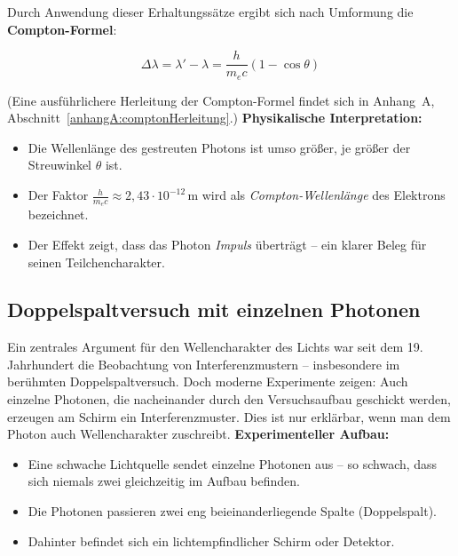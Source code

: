 Durch Anwendung dieser Erhaltungssätze ergibt sich nach Umformung die \textbf{Compton-Formel}:

\vspace{1em}
\begin{tcolorbox}[mathebox, title=Compton-Formel]
	\label{box:comptonFormel}
	\small
	\[
	\Delta \lambda = \lambda' - \lambda = \frac{h}{m_e c}(1 - \cos \theta)
	\]
\end{tcolorbox}
\vspace{1em}
(Eine ausführlichere Herleitung der Compton-Formel findet sich in Anhang~A, Abschnitt~\ref{anhangA:comptonHerleitung}.) %
\textbf{Physikalische Interpretation:}
\begin{itemize}
	\item Die Wellenlänge des gestreuten Photons ist umso größer, je größer der Streuwinkel \( \theta \) ist.
	\item Der Faktor \( \frac{h}{m_e c} \approx 2{,}43 \cdot 10^{-12}\,\mathrm{m} \) wird als \emph{Compton-Wellenlänge} des Elektrons bezeichnet.
	\item Der Effekt zeigt, dass das Photon \emph{Impuls} überträgt – ein klarer Beleg für seinen Teilchencharakter.
\end{itemize}

\vspace{1em}

\subsection{Doppelspaltversuch mit einzelnen Photonen}

Ein zentrales Argument für den Wellencharakter des Lichts war seit dem 19. Jahrhundert die Beobachtung von Interferenzmustern – insbesondere im berühmten Doppelspaltversuch. Doch moderne Experimente zeigen: Auch einzelne Photonen, die nacheinander durch den Versuchsaufbau geschickt werden, erzeugen am Schirm ein Interferenzmuster. Dies ist nur erklärbar, wenn man dem Photon auch Wellencharakter zuschreibt.
\newpage
\noindent
\textbf{Experimenteller Aufbau:}
\begin{itemize}
	\item Eine schwache Lichtquelle sendet einzelne Photonen aus – so schwach, dass sich niemals zwei gleichzeitig im Aufbau befinden.
	\item Die Photonen passieren zwei eng beieinanderliegende Spalte (Doppelspalt).
	\item Dahinter befindet sich ein lichtempfindlicher Schirm oder Detektor.
\end{itemize}

